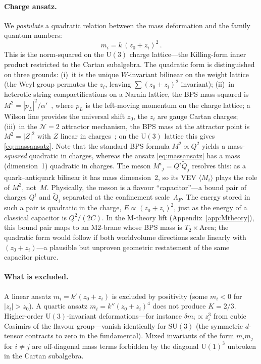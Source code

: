 \documentclass[12pt,a4paper]{article}
\newcommand{\SU}{\mathrm{SU}}
\newcommand{\UU}{\mathrm{U}}
\begin{document}
\paragraph{Charge ansatz.}
We \emph{postulate} a quadratic relation between the mass deformation
and the family quantum numbers:
\begin{equation}
  m_i = k\,(z_0 + z_i)^2\,.
  \label{eq:massansatz}
\end{equation}
This is the norm-squared on the $\UU(3)$ charge lattice---the
Killing-form inner product restricted to the Cartan subalgebra.
The quadratic form is distinguished on three grounds:
(i)~it is the unique $W$-invariant bilinear on the
weight lattice (the Weyl group permutes the $z_i$, leaving
$\sum(z_0 + z_i)^2$ invariant);
(ii)~in heterotic string compactifications on a Narain lattice,
the BPS mass-squared is
$M^2 = |p_L|^2/\alpha'$~\cite{Narain:1986}, where $p_L$ is the
left-moving momentum on the charge lattice; a Wilson line provides
the universal shift $z_0$, the $z_i$ are gauge Cartan charges;
(iii)~in the $\mathcal{N}=2$ attractor mechanism, the BPS mass
at the attractor point is $M^2 = |Z|^2$ with $Z$ linear in
charges~\cite{Ferrara:1995ih}; on the $\UU(3)$ lattice this
gives \eqref{eq:massansatz}.
Note that the standard BPS formula $M^2 \propto Q^2$ yields a
mass-\emph{squared} quadratic in charges, whereas the ansatz
\eqref{eq:massansatz} has a mass (dimension~1) quadratic in charges.
The meson $M^i{}_j = Q^i\tilde{Q}_j$ resolves this: as a
quark--antiquark bilinear it has mass dimension~2, so its
VEV $\langle M_i\rangle$ plays the role of $M^2$, not~$M$.
Physically, the meson is a flavour ``capacitor''---a bound pair
of charges $Q^i$ and $\tilde{Q}_i$ separated at the confinement
scale~$\Lambda_F$. The energy stored in such a pair is quadratic
in the charge, $E \propto (z_0{+}z_i)^2$, just as the energy of
a classical capacitor is $Q^2/(2C)$.
In the M-theory lift (Appendix~\ref{app:Mtheory}), this
bound pair maps to an M2-brane whose BPS mass is
$T_2 \times \text{Area}$; the quadratic form would follow if
both worldvolume directions scale linearly with
$(z_0{+}z_i)$---a plausible but unproven geometric restatement
of the same capacitor picture.

\paragraph{What is excluded.}
A linear ansatz $m_i = k'(z_0 + z_i)$ is excluded by
positivity (some $m_i < 0$ for $|z_i| > z_0$). A quartic ansatz
$m_i = k''(z_0+z_i)^4$ does not produce $K = 2/3$.
Higher-order $\UU(3)$-invariant deformations---for instance
$\delta m_i \propto z_i^3$ from cubic Casimirs of the flavour
group---vanish identically for $\SU(3)$ (the symmetric
$d$-tensor contracts to zero in the fundamental).
Mixed invariants of the form $m_i m_j$ for $i\neq j$ are
off-diagonal mass terms forbidden by the diagonal $\UU(1)^3$
unbroken in the Cartan subalgebra.
\end{document}
